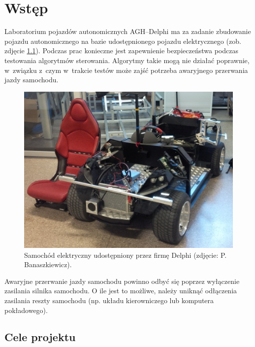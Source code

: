 \chapter{Wstęp}
\label{cha:wstep}

Laboratorium pojazdów autonomicznych AGH--Delphi ma za zadanie zbudowanie pojazdu autonomicznego na bazie udostępnionego pojazdu elektrycznego (zob. zdjęcie \ref{fig:electric_vehicle}). Podczas prac konieczne jest zapewnienie bezpieczeństwa podczas testowania algorytmów sterowania. Algorytmy takie mogą nie działać poprawnie, w~związku z~czym w~trakcie testów może zajść potrzeba awaryjnego przerwania jazdy samochodu.

\begin{figure}[h]
	\centering
	\includegraphics[scale=0.4]{pics/electric_vehicle_scaled.jpg}
	\caption{\label{fig:electric_vehicle}Samochód elektryczny udostępniony przez firmę Delphi (zdjęcie: P. Banaszkiewicz).}
\end{figure}

Awaryjne przerwanie jazdy samochodu powinno odbyć się poprzez wyłączenie zasilania silnika samochodu. O ile jest to możliwe, należy uniknąć odłączenia zasilania reszty samochodu (np. układu kierowniczego lub komputera pokładowego).


\section{Cele projektu}
\label{sec:cele_projektu}

